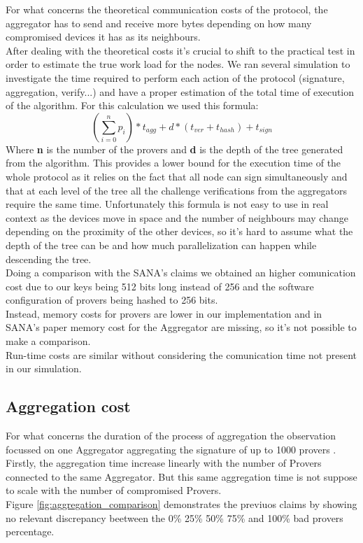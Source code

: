 For what concerns the theoretical communication costs of the protocol, 
the aggregator has to send and receive more bytes depending on how many compromised devices 
it has as its neighbours.\\

After dealing with the theoretical costs it's crucial to shift to the practical test in order to estimate the true work load for the nodes.
We ran several simulation to investigate the time required to perform each action of the protocol (signature, aggregation, verify...) and have a proper estimation of the total time of execution of the algorithm.
For this calculation we used this formula:
\[(\sum_{i=0}^{n} p_i) * t_{agg} + d * (t_{ver} + t_{hash}) + t_{sign} \]
Where \textbf{n} is the number of the provers and \textbf{d} is the depth of the tree generated from the algorithm.
This provides a lower bound for the execution time of the whole protocol as it relies on the fact that all node 
can sign simultaneously and that at each level of the tree all the challenge verifications from the aggregators require the same time.
Unfortunately this formula is not easy to use in real context as the devices move in space and the number of neighbours may change depending on the proximity of the other devices, so it's hard to assume what the depth of the tree can be and how much parallelization can happen while descending the tree.\\

Doing a comparison with the SANA's claims we obtained an higher comunication cost due to our keys being 512 bits long instead of 256 and the software configuration of provers being hashed to 256 bits.\\
Instead, memory costs for provers are lower in our implementation and in SANA's paper memory cost for the Aggregator are missing, so it's not possible to make a comparison.\\
Run-time costs are similar without considering the comunication time not present in our simulation.\\

\subsection{Aggregation cost}
For what concerns the duration of the process of aggregation the observation focussed on one Aggregator aggregating the signature of up to 1000 provers .
Firstly, the aggregation time increase linearly with the number of Provers connected to the same Aggregator.
But this same aggregation time is not suppose to scale with the number of compromised Provers.\\
Figure \ref{fig:aggregation_comparison} demonstrates the previuos claims by showing no relevant discrepancy beetween the 0\% 25\% 50\% 75\% and 100\% bad provers percentage.

